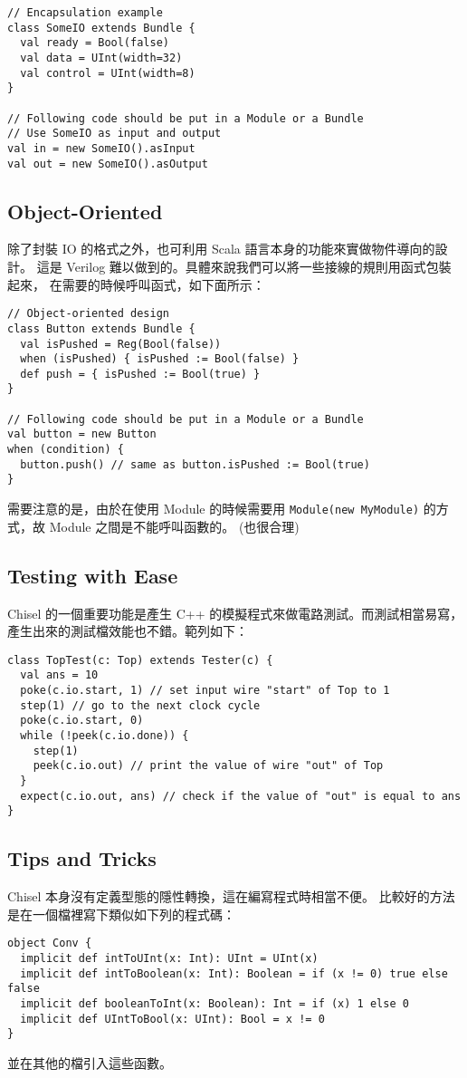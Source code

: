 \documentclass[12pt, a4paper]{article}
\begin{document}
\begin{verbatim}
// Encapsulation example
class SomeIO extends Bundle {
  val ready = Bool(false)
  val data = UInt(width=32)
  val control = UInt(width=8)
}

// Following code should be put in a Module or a Bundle
// Use SomeIO as input and output
val in = new SomeIO().asInput
val out = new SomeIO().asOutput
\end{verbatim}
\subsection{Object-Oriented}
除了封裝 IO 的格式之外，也可利用 Scala 語言本身的功能來實做物件導向的設計。
這是 Verilog 難以做到的。具體來說我們可以將一些接線的規則用函式包裝起來，
在需要的時候呼叫函式，如下面所示：

\begin{verbatim}
// Object-oriented design
class Button extends Bundle {
  val isPushed = Reg(Bool(false))
  when (isPushed) { isPushed := Bool(false) }
  def push = { isPushed := Bool(true) }
}

// Following code should be put in a Module or a Bundle
val button = new Button
when (condition) {
  button.push() // same as button.isPushed := Bool(true)
}
\end{verbatim}

需要注意的是，由於在使用 Module 的時候需要用 {\tt Module(new MyModule)}
的方式，故 Module 之間是不能呼叫函數的。 (也很合理)

\subsection{Testing with Ease}
Chisel 的一個重要功能是產生 C++ 的模擬程式來做電路測試。而測試相當易寫，
產生出來的測試檔效能也不錯。範列如下：
\begin{verbatim}
class TopTest(c: Top) extends Tester(c) {
  val ans = 10
  poke(c.io.start, 1) // set input wire "start" of Top to 1
  step(1) // go to the next clock cycle
  poke(c.io.start, 0)
  while (!peek(c.io.done)) {
    step(1)
    peek(c.io.out) // print the value of wire "out" of Top
  }
  expect(c.io.out, ans) // check if the value of "out" is equal to ans
}
\end{verbatim}

\subsection{Tips and Tricks}
Chisel 本身沒有定義型態的隱性轉換，這在編寫程式時相當不便。
比較好的方法是在一個檔裡寫下類似如下列的程式碼：
\begin{verbatim}
object Conv {
  implicit def intToUInt(x: Int): UInt = UInt(x)
  implicit def intToBoolean(x: Int): Boolean = if (x != 0) true else false
  implicit def booleanToInt(x: Boolean): Int = if (x) 1 else 0
  implicit def UIntToBool(x: UInt): Bool = x != 0
}
\end{verbatim}
並在其他的檔引入這些函數。
\end{document}
